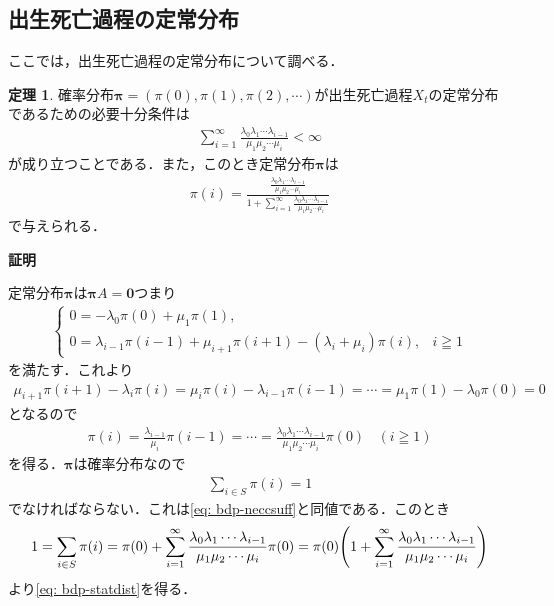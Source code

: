 \documentclass[dvipdfmx]{jsarticle}
\makeatletter
\numberwithin{equation}{section}
\theoremstyle{definition}
\newtheorem{thm}{定理}[section]
\renewenvironment{proof}[1][\proofname]{\par
  \pushQED{\qed}%
  \normalfont \topsep6\p@\@plus6\p@\relax
  \trivlist
  \item\relax
  {\bfseries
  #1\@addpunct{.}}\hspace\labelsep\ignorespaces
}{%
  \popQED\endtrivlist\@endpefalse
}
\renewcommand{\proofname}{証明}
\newcommand{\bpi}{\bm{\pi}}
\newcommand{\0}{\bm{0}}
\newcommand{\1}{\bm{1}}
\makeatother
\begin{document}
\subsection{出生死亡過程の定常分布}
ここでは，出生死亡過程の定常分布について調べる．
\begin{thm}
  確率分布$\bm{\pi} = (\pi(0), \pi(1), \pi(2), \cdots)$が出生死亡過程$X_t$の定常分布であるための必要十分条件は
  \begin{gather}\label{eq: bdp-neccsuff}
    \sum_{i=1}^{\infty} \frac{\lambda_0 \lambda_1 \cdots \lambda_{i-1}}{\mu_1 \mu_2 \cdots \mu_i} < \infty
  \end{gather}
  が成り立つことである．また，このとき定常分布$\bpi$は  
  \begin{gather}\label{eq: bdp-statdist}
    \pi(i) = \frac{\frac{\lambda_0 \lambda_1 \cdots \lambda_{i-1}}{\mu_1 \mu_2 \cdots \mu_i}}{1 + \sum_{i=1}^{\infty} \frac{\lambda_0 \lambda_1 \cdots \lambda_{i-1}}{\mu_1 \mu_2 \cdots \mu_i}}
  \end{gather}
  で与えられる．
\end{thm}

\begin{proof}
  定常分布$\bm{\pi}$は$\bm{\pi} A = \0$つまり
  \begin{align}
    \begin{cases}
      0 = -\lambda_0 \pi(0) + \mu_1 \pi(1), & \\
      0 = \lambda_{i-1} \pi(i-1) + \mu_{i+1} \pi(i+1) -(\lambda_i + \mu_i) \pi(i), & i \geqq 1
  \end{cases}
  \end{align}
  を満たす．これより
  \begin{align}
    \mu_{i+1} \pi(i+1) -\lambda_i \pi(i) 
    = \mu_i \pi(i) -\lambda_{i-1} \pi(i-1) 
    = \cdots = \mu_1 \pi(1) -\lambda_0 \pi(0) = 0
  \end{align}
  となるので
  \begin{align}
    \pi(i) = \frac{\lambda_{i-1}}{\mu_i} \pi(i-1) = \cdots = \frac{\lambda_0 \lambda_1 \cdots \lambda_{i-1}}{\mu_1 \mu_2 \cdots \mu_i}\pi(0) ~~~~ (i \geqq 1)
  \end{align}
  を得る．$\bm{\pi}$は確率分布なので
  \begin{align}
    \sum_{i \in S} \pi(i) = 1
  \end{align}
  でなければならない．これは\eqref{eq: bdp-neccsuff}と同値である．このとき
  \begin{align}
    1 = \sum_{i \in S} \pi(i)
    = \pi(0) + \sum_{i=1}^{\infty} \frac{\lambda_0 \lambda_1 \cdots \lambda_{i-1}}{\mu_1 \mu_2 \cdots \mu_i} \pi(0)
    = \pi(0) \qty(1 + \sum_{i=1}^{\infty} \frac{\lambda_0 \lambda_1 \cdots \lambda_{i-1}}{\mu_1 \mu_2 \cdots \mu_i} )
  \end{align}
  より\eqref{eq: bdp-statdist}を得る．
\end{proof}
\end{document}
